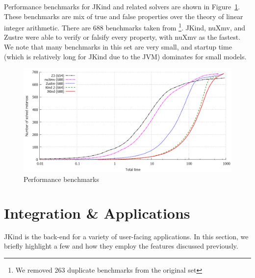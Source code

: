 \documentclass{llncs}
\newcommand{\jkind}{{\sc JKind}\xspace}
\newcommand{\jkindapi}{{\sc JKindApi}\xspace}
\newcommand{\lustre}{{\sc Lustre}\xspace}
\newcommand{\nuxmv}{{\sc nuXmv}\xspace}
\newcommand{\zustre}{{\sc Zustre}\xspace}
\newcommand{\mike}[1]{\textcolor{red}{#1}}
\begin{document}
Performance benchmarks for \jkind and related solvers are shown in
Figure~\ref{fig:benchmark}. These benchmarks are mix of true and false
properties over the theory of linear integer arithmetic. There are 688
benchmarks taken from \cite{cimatti2014tacas}\footnote{We removed 263
  duplicate benchmarks from the original set}.  \jkind, \nuxmv, and
\zustre were able to verify or falsify every property, with \nuxmv as
the fastest. We note that many benchmarks in this set are very small,
and startup time (which is relatively long for \jkind due to the JVM)
dominates for small models.

\begin{figure}
  \begin{center}
    \includegraphics[width=\textwidth]{graph.png}
  \end{center}
  \vspace{-2em}
  \caption{Performance benchmarks}
  \vspace{-1em}
  \label{fig:benchmark}
\end{figure}


\section{Integration \& Applications}


\jkind is the back-end for a variety of user-facing applications. In this section, we briefly highlight a few and how they employ the features discussed previously.
%
%
\end{document}
